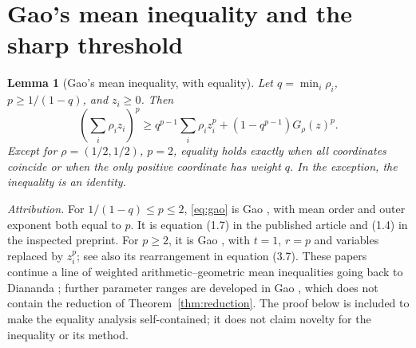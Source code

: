 \documentclass[11pt,a4paper]{article}
\numberwithin{equation}{section}
\newtheorem{lemma}[theorem]{Lemma}
\theoremstyle{definition}
\theoremstyle{remark}
\begin{document}
\section{Gao's mean inequality and the sharp threshold}\label{sec:phase}

\begin{lemma}[Gao's mean inequality, with equality]\label{lem:gao}
Let \(q=\min_i\rho_i\), \(p\ge1/(1-q)\), and \(z_i\ge0\). Then
\begin{equation}\label{eq:gao}
\left(\sum_i\rho_i z_i\right)^p
\ge q^{p-1}\sum_i\rho_i z_i^p
 +(1-q^{p-1})G_\rho(z)^p.
\end{equation}
Except for \(\rho=(1/2,1/2)\), \(p=2\), equality holds exactly when all
coordinates coincide or when the only positive coordinate has weight
\(q\). In the exception, the inequality is an identity.
\end{lemma}

\noindent\textit{Attribution.}
For \(1/(1-q)\le p\le2\), \eqref{eq:gao} is Gao \cite[Theorem~1.2]{gao09},
with mean order and outer exponent both equal to \(p\). It is equation
(1.7) in the published article and (1.4) in the inspected preprint. For
\(p\ge2\), it is Gao \cite[Theorem~3.1]{gao03}, with \(t=1\), \(r=p\) and
variables replaced by \(z_i^p\); see also its rearrangement in equation
(3.7). These papers continue a line of weighted arithmetic--geometric mean
inequalities going back to Diananda \cite{diananda}; further parameter
ranges are developed in Gao \cite{gao18}, which does not contain the
reduction of Theorem~\ref{thm:reduction}. The proof below is included to
make the equality analysis self-contained; it does not claim novelty for the
inequality or its method.
\end{document}
